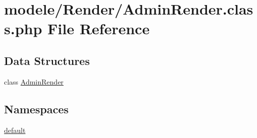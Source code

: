 \hypertarget{_admin_render_8class_8php}{}\section{modele/\+Render/\+Admin\+Render.class.\+php File Reference}
\label{_admin_render_8class_8php}
\subsection*{Data Structures}
\begin{DoxyCompactItemize}
\item 
class \hyperlink{class_admin_render}{Admin\+Render}
\end{DoxyCompactItemize}
\subsection*{Namespaces}
\begin{DoxyCompactItemize}
\item 
 \hyperlink{namespacedefault}{default}
\end{DoxyCompactItemize}
